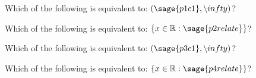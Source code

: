 \documentclass{ximeraXloud}
\begin{document}
\begin{problem}
    Which of the following is equivalent to: $(\sage{p1c1}, \infty)$?
    \begin{multipleChoice}
    \end{multipleChoice}
    
\end{problem}


\begin{problem}
    Which of the following is equivalent to: $\{ x \in \mathbb{R} : \sage{p2relate} \}$?
    \begin{multipleChoice}
    \end{multipleChoice}
\end{problem}


\begin{problem}
    Which of the following is equivalent to: $(\sage{p3c1}, \infty)$?
    \begin{multipleChoice}
    \end{multipleChoice}
    
\end{problem}


\begin{problem}
    Which of the following is equivalent to: $\{ x \in \mathbb{R} : \sage{p4relate} \}$?
    \begin{multipleChoice}
    \end{multipleChoice}
\end{problem}
\end{document}
